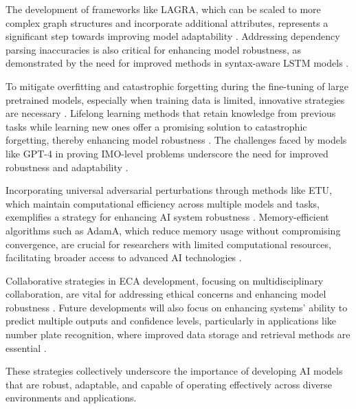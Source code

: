 The development of frameworks like LAGRA, which can be scaled to more complex graph structures and incorporate additional attributes, represents a significant step towards improving model adaptability \cite{shinji2024learningattributedgraphletspredictive}. Addressing dependency parsing inaccuracies is also critical for enhancing model robustness, as demonstrated by the need for improved methods in syntax-aware LSTM models \cite{qian2017syntaxawarelstmmodel}.



To mitigate overfitting and catastrophic forgetting during the fine-tuning of large pretrained models, especially when training data is limited, innovative strategies are necessary \cite{zhang2023adding}. Lifelong learning methods that retain knowledge from previous tasks while learning new ones offer a promising solution to catastrophic forgetting, thereby enhancing model robustness \cite{zhao2022lifelonglearningmultilingualneural}. The challenges faced by models like GPT-4 in proving IMO-level problems underscore the need for improved robustness and adaptability \cite{liu2023fimochallengeformaldataset}.



Incorporating universal adversarial perturbations through methods like ETU, which maintain computational efficiency across multiple models and tasks, exemplifies a strategy for enhancing AI system robustness \cite{zhang2024universaladversarialperturbationsvisionlanguage}. Memory-efficient algorithms such as AdamA, which reduce memory usage without compromising convergence, are crucial for researchers with limited computational resources, facilitating broader access to advanced AI technologies \cite{zhang2023adamaccumulationreducememory}.



Collaborative strategies in ECA development, focusing on multidisciplinary collaboration, are vital for addressing ethical concerns and enhancing model robustness \cite{korre2023takesvillagemultidisciplinaritycollaboration}. Future developments will also focus on enhancing systems' ability to predict multiple outputs and confidence levels, particularly in applications like number plate recognition, where improved data storage and retrieval methods are essential \cite{adak2022automaticnumberplaterecognition}. 



These strategies collectively underscore the importance of developing AI models that are robust, adaptable, and capable of operating effectively across diverse environments and applications.




